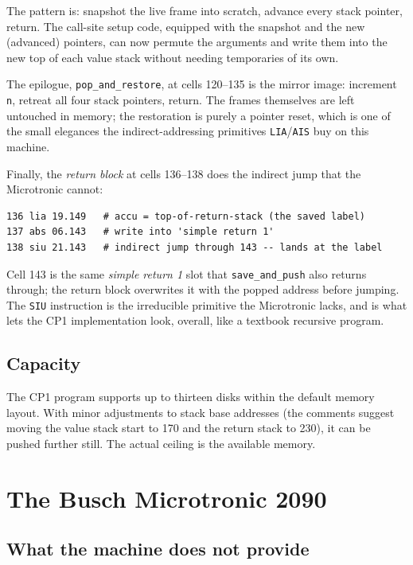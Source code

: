 \documentclass[11pt,a4paper]{article}
\begin{document}
\noindent
The pattern is: snapshot the live frame into scratch, advance every
stack pointer, return. The call-site setup code, equipped with the
snapshot and the new (advanced) pointers, can now permute the
arguments and write them into the new top of each value stack
without needing temporaries of its own.

The epilogue, \texttt{pop\_and\_restore}, at cells 120--135 is the
mirror image: increment \texttt{n}, retreat all four stack pointers,
return. The frames themselves are left untouched in memory; the
restoration is purely a pointer reset, which is one of the small
elegances the indirect-addressing primitives \texttt{LIA}/\texttt{AIS}
buy on this machine.

Finally, the \emph{return block} at cells 136--138 does the indirect
jump that the Microtronic cannot:

\begin{lstlisting}
136 lia 19.149   # accu = top-of-return-stack (the saved label)
137 abs 06.143   # write into 'simple return 1'
138 siu 21.143   # indirect jump through 143 -- lands at the label
\end{lstlisting}

\noindent
Cell 143 is the same \emph{simple return 1} slot that
\texttt{save\_and\_push} also returns through; the return block
overwrites it with the popped address before jumping. The
\texttt{SIU} instruction is the irreducible primitive the
Microtronic lacks, and is what lets the CP1 implementation look,
overall, like a textbook recursive program.

\subsection{Capacity}

The CP1 program supports up to thirteen disks within the default
memory layout. With minor adjustments to stack base addresses (the
comments suggest moving the value stack start to 170 and the return
stack to 230), it can be pushed further still. The actual ceiling is
the available memory.

\section{The Busch Microtronic 2090}

\subsection{What the machine does not provide}
\end{document}
